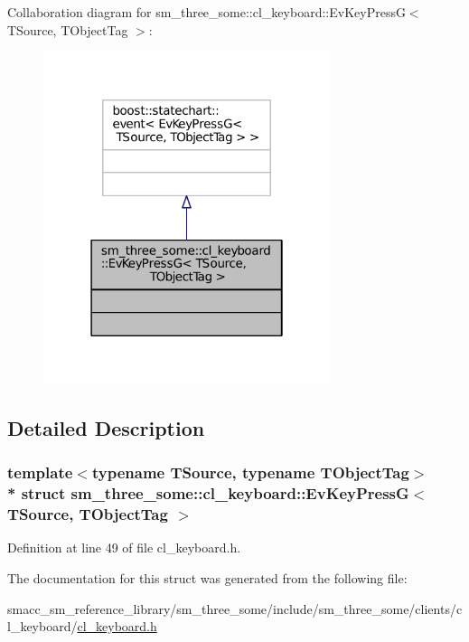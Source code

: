 Collaboration diagram for sm\+\_\+three\+\_\+some\+:\+:cl\+\_\+keyboard\+:\+:Ev\+Key\+PressG$<$ T\+Source, T\+Object\+Tag $>$\+:
\nopagebreak
\begin{figure}[H]
\begin{center}
\leavevmode
\includegraphics[width=238pt]{structsm__three__some_1_1cl__keyboard_1_1EvKeyPressG__coll__graph}
\end{center}
\end{figure}


\subsection{Detailed Description}
\subsubsection*{template$<$typename T\+Source, typename T\+Object\+Tag$>$\\*
struct sm\+\_\+three\+\_\+some\+::cl\+\_\+keyboard\+::\+Ev\+Key\+Press\+G$<$ T\+Source, T\+Object\+Tag $>$}



Definition at line 49 of file cl\+\_\+keyboard.\+h.



The documentation for this struct was generated from the following file\+:\begin{DoxyCompactItemize}
\item 
smacc\+\_\+sm\+\_\+reference\+\_\+library/sm\+\_\+three\+\_\+some/include/sm\+\_\+three\+\_\+some/clients/cl\+\_\+keyboard/\hyperlink{cl__keyboard_8h}{cl\+\_\+keyboard.\+h}\end{DoxyCompactItemize}
